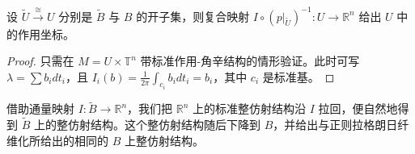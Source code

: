 \begin{lemma*}
设 $\tilde{U}\xrightarrow{\cong} U$ 分别是 $\tilde{B}$ 与 $B$ 的开子集，则复合映射 $I\circ\left(p\vert_{\tilde{U}}\right)^{-1}\colon U\to\mathbb{R}^n$ 给出 $U$ 中的作用坐标。
\end{lemma*}

\begin{proof}
只需在 $M=U\times\mathbb{T}^n$ 带标准作用-角辛结构的情形验证。此时可写 $\lambda =\sum b_i dt_i$，且 $I_i (b)=\displaystyle\frac{1}{2\pi}\int_{c_i} b_idt_i =b_i$，其中 $c_i$ 是标准基。
\end{proof}


借助通量映射 $I\colon\tilde{B}\to\mathbb{R}^n$，我们把 $\mathbb{R}^n$ 上的标准整仿射结构沿 $I$ 拉回，便自然地得到 $\tilde{B}$ 上的整仿射结构。这个整仿射结构随后下降到 $B$，并给出与正则拉格朗日纤维化所给出的相同的 $B$ 上整仿射结构。


